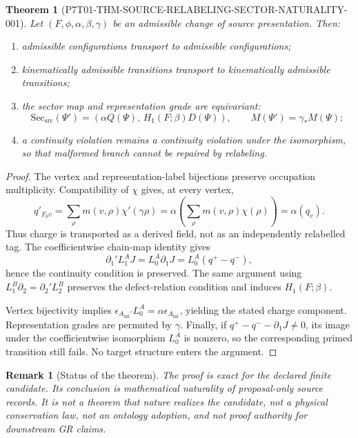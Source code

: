 \documentclass[11pt]{article}
\newtheorem{theorem}{Theorem}
\newtheorem{remark}{Remark}
\newcommand{\Aint}{A_{\mathrm{int}}}
\newcommand{\Sect}{\mathrm{Sec}_{\mathrm{src}}}
\begin{document}
\begin{theorem}[P7T01-THM-SOURCE-RELABELING-SECTOR-NATURALITY-001]
Let \((F,\phi,\alpha,\beta,\gamma)\) be an admissible change of source
presentation. Then:
\begin{enumerate}[leftmargin=*]
\item admissible configurations transport to admissible configurations;
\item kinematically admissible transitions transport to kinematically
  admissible transitions;
\item the sector map and representation grade are equivariant:
  \[
    \Sect(\Psi')=
    \left(
      \alpha Q(\Psi),\,
      H_1(F;\beta)D(\Psi)
    \right),
    \qquad
    M(\Psi')=\gamma_*M(\Psi);
  \]
\item a continuity violation remains a continuity violation under the
  isomorphism, so that malformed branch cannot be repaired by relabeling.
\end{enumerate}
\end{theorem}

\begin{proof}
The vertex and representation-label bijections preserve occupation
multiplicity. Compatibility of \(\chi\) gives, at every vertex,
\[
  q'_{F_0v}
  =
  \sum_\rho m(v,\rho)\chi'(\gamma\rho)
  =
  \alpha\!\left(\sum_\rho m(v,\rho)\chi(\rho)\right)
  =
  \alpha(q_v).
\]
Thus charge is transported as a derived field, not as an independently
relabelled tag. The coefficientwise chain-map identity gives
\[
  \partial_1'L_1^A J
  =
  L_0^A\partial_1J
  =
  L_0^A(q^+-q^-),
\]
hence the continuity condition is preserved. The same argument using
\(L_1^B\partial_2=\partial_2'L_2^B\) preserves the defect-relation
condition and induces \(H_1(F;\beta)\).

Vertex bijectivity implies
\(\epsilon_{\Aint'}L_0^A=\alpha\epsilon_{\Aint}\), yielding the stated
charge component. Representation grades are permuted by \(\gamma\).
Finally, if
\(q^+-q^--\partial_1J\neq0\), its image under the coefficientwise
isomorphism \(L_0^A\) is nonzero, so the corresponding primed transition
still fails. No target structure enters the argument.
\end{proof}

\begin{remark}[Status of the theorem]
The proof is exact for the declared finite candidate. Its conclusion is
mathematical naturality of proposal-only source records. It is not a theorem
that nature realizes the candidate, not a physical conservation law, not an
ontology adoption, and not proof authority for downstream GR claims.
\end{remark}
\end{document}
